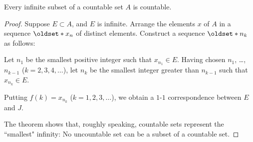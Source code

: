 \begin{theorem}
    Every infinite subset of a countable set \(A\) is countable.
    \begin{proof}
        Suppose \(E\subset A\), and \(E\) is infinite. Arrange the elements \(x\) of \(A\) in a sequence \(\set{x_n}\) of distinct elements. Construct a sequence \(\set{n_k}\) as follows:
        
        Let \(n_1\) be the smallest positive integer such that \(x_{n_1}\in E\). Having chosen \(n_1\), \ldots, \(n_{k-1}\) (\(k=2,3,4,\ldots\)), let \(n_k\) be the smallest integer greater than \(n_{k-1}\) such that \(x_{n_k}\in E\).
        
        Putting \(f\left(k\right)=x_{n_k}\) (\(k=1,2,3,\ldots\)), we obtain a \(1\)-\(1\) correspondence between \(E\) and \(J\).
        
        The theorem shows that, roughly speaking, countable sets represent the ``smallest" infinity: No uncountable set can be a subset of a countable set.
    \end{proof}
\end{theorem}

